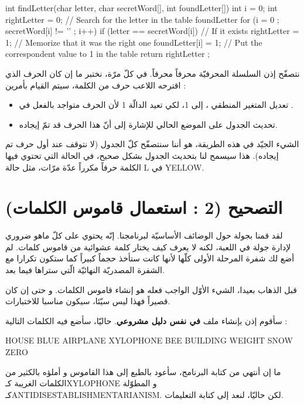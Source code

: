 \begin{Csource}
int findLetter(char letter, char secretWord[], int foundLetter[])
{
  int i = 0;
  int rightLetter = 0;
  // Search for the letter in the table foundLetter
  for (i = 0 ; secretWord[i] != '\0' ; i++)
  {
    if (letter == secretWord[i]) // If it exists
    {
      rightLetter = 1; // Memorize that it was the right one
      foundLetter[i] = 1; // Put the correspondent value to 1 in the table
    }
  }
  return rightLetter ;
}
\end{Csource}

نتصفّح إذن السلسلة المحرفيّة
محرفاً محرفاً. في كلّ مرّة، نختبر ما إن كان الحرف الذي اقترحه اللاعب حرف من الكلمة، سيتم القيام بأمرين :
\begin{itemize}
  \item تعديل المتغير المنطقي
،
إلى  1، لكي تعيد الدالّة 1 لأن الحرف متواجد بالفعل في
.
  \item تحديث الجدول
على الموضع الحالي للإشارة إلى أنّ هذا الحرف قد تمّ إيجاده.
\end{itemize}

الشيء الجيّد في هذه الطريقة، هو أننا سنتصفّح كلّ الجدول (لا نتوقف عند أول حرف تم إيجاده). هذا سيسمح لنا بتحديث الجدول
بشكل صحيح، في الحالة التي تحتوي فيها الكلمة حرفاً مكرراً عدّة مرّات، مثل حالة
\textenglish{L}
في
\textenglish{YELLOW}.

\section{التصحيح (2 : استعمال قاموس الكلمات)}
لقد قمنا بجولة حول الوضائف الأساسيّة لبرنامجنا. إنّه يحتوي على كلّ ماهو ضروري لإدارة جولة في اللعبة، لكنه لا يعرف كيف يختار كلمة عشوائية من قاموس كلمات. لم أضع لك شفرة المرحلة الأولى كلّها لأنها كانت ستأخذ حجماً كبيراً كما ستكون تكرارا مع الشفرة المصدريّة النهائيّة الّتي ستراها فيما بعد.

قبل الذهاب بعيدا، الشيء الأوّل الواجب فعله هو إنشاء قاموس الكلمات. و حتى إن كان قصيراً فهذا ليس سيّئا، سيكون مناسبا للاختبارات.

سأقوم إذن بإنشاء ملف
\textbf{في نفس دليل مشروعي}.
حاليّا، سأضع فيه الكلمات التالية :

\begin{Csource}
HOUSE
BLUE
AIRPLANE
XYLOPHONE
BEE
BUILDING
WEIGHT
SNOW
ZERO
\end{Csource}

ما إن أنتهي من كتابة البرنامج، سأعود بالطبع إلى هذا القاموس و أملؤه بالكثير من الكلمات الغريبة كـ\textenglish{XYLOPHONE}
و المطوّلة كـ\textenglish{ANTIDISESTABLISHMENTARIANISM}.
لكن حاليّا، لنعد إلى كتابة التعليمات.

